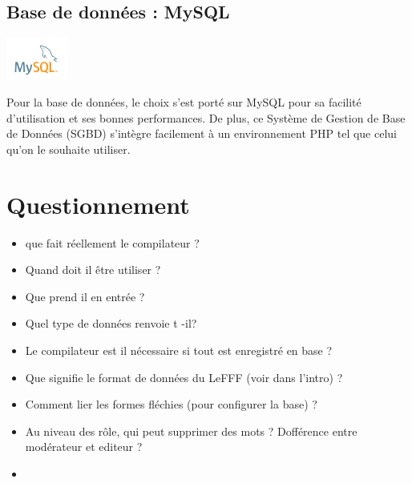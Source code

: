 \documentclass[12pt,a4paper]{article}
\begin{document}
\subsection{Base de données : MySQL}
\begin{center}
  \includegraphics[width=2cm]{img/mysql.png}
\end{center}
Pour la base de données, le choix s'est porté sur MySQL pour sa facilité d'utilisation et ses bonnes performances. 
De plus, ce Système de Gestion de Base de Données (SGBD) s'intègre facilement à un environnement PHP tel que celui qu'on le souhaite utiliser.


\section{Questionnement}
\begin{itemize}  
  \item que fait réellement le compilateur ?
  \item Quand doit il être utiliser ?
  \item Que prend il en entrée ?
  \item Quel type de données renvoie t -il?
  \item Le compilateur est il nécessaire si tout est enregistré en base ?
  \item Que signifie le format de données du LeFFF (voir dans l'intro) ?
  \item Comment lier les formes fléchies (pour configurer la base) ?
  \item Au niveau des rôle, qui peut supprimer des mots ? Dofférence entre modérateur et editeur ?
  \item 
\end{itemize}



\end{document}
